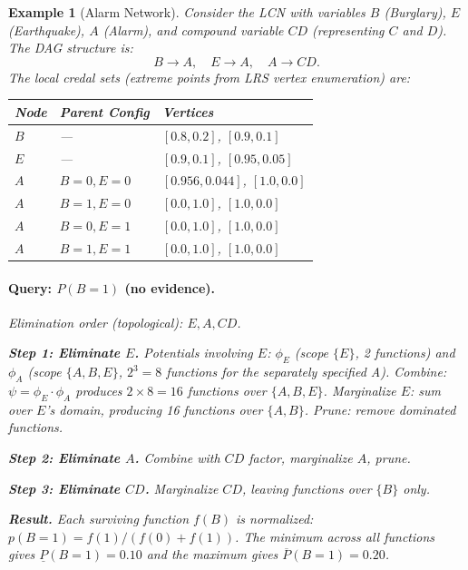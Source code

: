 \documentclass{article}
\newtheorem{example}{Example}
\begin{document}
\begin{example}[Alarm Network]
Consider the LCN with variables $B$ (Burglary), $E$ (Earthquake), $A$ (Alarm),
and compound variable $CD$ (representing $C$ and $D$). The DAG structure is:
\[
  B \to A, \quad E \to A, \quad A \to CD.
\]
The local credal sets (extreme points from LRS vertex enumeration) are:

\begin{center}
\begin{tabular}{lll}
\toprule
\textbf{Node} & \textbf{Parent Config} & \textbf{Vertices} \\
\midrule
$B$ & --- & $[0.8, 0.2]$, $[0.9, 0.1]$ \\
$E$ & --- & $[0.9, 0.1]$, $[0.95, 0.05]$ \\
$A$ & $B{=}0, E{=}0$ & $[0.956, 0.044]$, $[1.0, 0.0]$ \\
$A$ & $B{=}1, E{=}0$ & $[0.0, 1.0]$, $[1.0, 0.0]$ \\
$A$ & $B{=}0, E{=}1$ & $[0.0, 1.0]$, $[1.0, 0.0]$ \\
$A$ & $B{=}1, E{=}1$ & $[0.0, 1.0]$, $[1.0, 0.0]$ \\
\bottomrule
\end{tabular}
\end{center}

\paragraph{Query: $P(B{=}1)$ (no evidence).}
Elimination order (topological): $E, A, CD$.

\textbf{Step 1: Eliminate $E$.}
Potentials involving $E$: $\phi_E$ (scope $\{E\}$, 2 functions) and $\phi_A$
(scope $\{A, B, E\}$, $2^3 = 8$ functions for the separately specified A).
Combine: $\psi = \phi_E \cdot \phi_A$ produces $2 \times 8 = 16$ functions
over $\{A, B, E\}$. Marginalize $E$: sum over $E$'s domain, producing 16
functions over $\{A, B\}$. Prune: remove dominated functions.

\textbf{Step 2: Eliminate $A$.}
Combine with $CD$ factor, marginalize $A$, prune.

\textbf{Step 3: Eliminate $CD$.}
Marginalize $CD$, leaving functions over $\{B\}$ only.

\textbf{Result.} Each surviving function $f(B)$ is normalized:
$p(B{=}1) = f(1) / (f(0) + f(1))$. The minimum across all functions gives
$\underline{P}(B{=}1) = 0.10$ and the maximum gives
$\overline{P}(B{=}1) = 0.20$.
\end{example}
\end{document}
